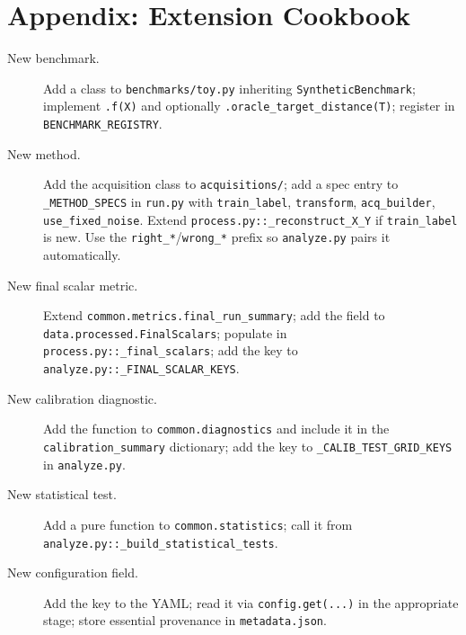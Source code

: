 \documentclass[11pt]{article}
\begin{document}
\section*{Appendix: Extension Cookbook}
\label{sec:cookbook}
 
\begin{description}
 
  \item[New benchmark.]
  Add a class to \texttt{benchmarks/toy.py} inheriting \texttt{SyntheticBenchmark};
  implement \texttt{.f(X)} and optionally \texttt{.oracle\_target\_distance(T)};
  register in \texttt{BENCHMARK\_REGISTRY}.
 
  \item[New method.]
  Add the acquisition class to \texttt{acquisitions/};
  add a spec entry to \texttt{\_METHOD\_SPECS} in \texttt{run.py} with
  \texttt{train\_label}, \texttt{transform}, \texttt{acq\_builder},
  \texttt{use\_fixed\_noise}.
  Extend \texttt{process.py::\_reconstruct\_X\_Y} if \texttt{train\_label} is new.
  Use the \texttt{right\_*}/\texttt{wrong\_*} prefix so \texttt{analyze.py} pairs it
  automatically.
 
  \item[New final scalar metric.]
  Extend \texttt{common.metrics.final\_run\_summary};
  add the field to \texttt{data.processed.FinalScalars};
  populate in \texttt{process.py::\_final\_scalars};
  add the key to \texttt{analyze.py::\_FINAL\_SCALAR\_KEYS}.
 
  \item[New calibration diagnostic.]
  Add the function to \texttt{common.diagnostics} and include it in the
  \texttt{calibration\_summary} dictionary;
  add the key to \texttt{\_CALIB\_TEST\_GRID\_KEYS} in \texttt{analyze.py}.
 
  \item[New statistical test.]
  Add a pure function to \texttt{common.statistics};
  call it from \texttt{analyze.py::\_build\_statistical\_tests}.
 
  \item[New configuration field.]
  Add the key to the YAML;
  read it via \texttt{config.get(...)} in the appropriate stage;
  store essential provenance in \texttt{metadata.json}.
 
\end{description}
 
\end{document}
